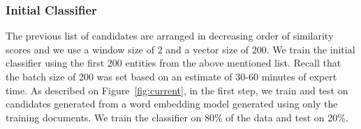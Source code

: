 
\subsubsection{Initial Classifier}
The previous list of  candidates are arranged in decreasing order of similarity scores and we use a window size of 2 and a vector size of 200. 
We train the initial classifier using the first
200 entities from the above mentioned list.
Recall that the batch size of 200 was set based on an estimate of 30-60 minutes of expert time.
As described on Figure~\ref{fig:current}, in the first step, we train and test on candidates generated from a word embedding model generated using only the training documents. 
We train the classifier on 80\% of the data and test on 20\%.

